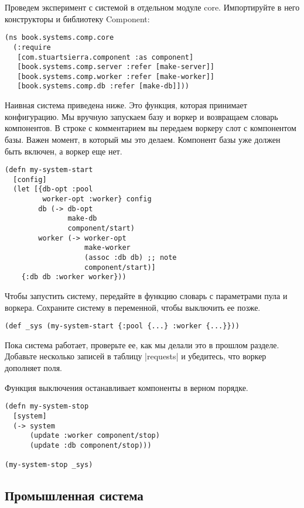 Проведем эксперимент с системой в отдельном модуле core. Импортируйте в него
конструкторы и библиотеку Component:

\begin{verbatim}
(ns book.systems.comp.core
  (:require
   [com.stuartsierra.component :as component]
   [book.systems.comp.server :refer [make-server]]
   [book.systems.comp.worker :refer [make-worker]]
   [book.systems.comp.db :refer [make-db]]))
\end{verbatim}

Наивная система приведена ниже. Это функция, которая принимает конфигурацию. Мы
вручную запускаем базу и воркер и возвращаем словарь компонентов. В строке с
комментарием вы передаем воркеру слот с компонентом базы. Важен момент, в
который мы это делаем. Компонент базы уже должен быть включен, а воркер еще нет.

\begin{verbatim}
(defn my-system-start
  [config]
  (let [{db-opt :pool
         worker-opt :worker} config
        db (-> db-opt
               make-db
               component/start)
        worker (-> worker-opt
                   make-worker
                   (assoc :db db) ;; note
                   component/start)]
    {:db db :worker worker}))
\end{verbatim}

Чтобы запустить систему, передайте в функцию словарь с параметрами пула и
воркера. Сохраните систему в переменной, чтобы выключить ее позже.

\begin{verbatim}
(def _sys (my-system-start {:pool {...} :worker {...}}))
\end{verbatim}

Пока система работает, проверьте ее, как мы делали это в прошлом
разделе. Добавьте несколько записей в таблицу \spverb|requests| и убедитесь, что воркер
дополняет поля.

Функция выключения останавливает компоненты в верном порядке.

\begin{verbatim}
(defn my-system-stop
  [system]
  (-> system
      (update :worker component/stop)
      (update :db component/stop)))

(my-system-stop _sys)
\end{verbatim}

\subsection{Промышленная система}

